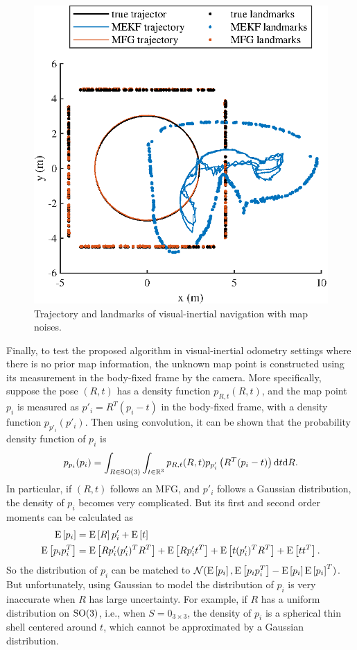 \begin{figure}
	\centering
	\includegraphics[scale=1.1]{figures/VIO-map-filter-trajectory1}
	\caption{Trajectory and landmarks of visual-inertial navigation with map noises.}
	\label{fig:VIO-map-filter-trajectory1}
\end{figure}

Finally, to test the proposed algorithm in visual-inertial odometry settings where there is no prior map information, the unknown map point is constructed using its measurement in the body-fixed frame by the camera.
More specifically, suppose the pose $(R,t)$ has a density function $p_{R,t}(R,t)$, and the map point $p_i$ is measured as $p'_i = R^T(p_i-t)$ in the body-fixed frame, with a density function $p_{p'_i}(p'_i)$.
Then using convolution, it can be shown that the probability density function of $p_i$ is
\begin{align} \label{eqn:VIO-transformPoint}
	p_{p_i}(p_i) = \int_{R\in\mathrm{SO}(3)} \int_{t\in\mathbb{R}^3} p_{R,t}(R,t) p_{p'_i}\left( R^T(p_i-t) \right) \mathrm{d} t \mathrm{d} R.
\end{align}
In particular, if $(R,t)$ follows an MFG, and $p'_i$ follows a Gaussian distribution, the density of $p_i$ becomes very complicated.
But its first and second order moments can be calculated as
\begin{align}
	\mathrm{E}\left[ p_i \right] &= \mathrm{E}\left[ R \right]p'_i + \mathrm{E}\left[ t \right] \\
	\mathrm{E}\left[ p_ip_i^T \right] &= \mathrm{E}\left[ Rp'_i(p'_i)^TR^T \right] + \mathrm{E}\left[ Rp'_it^T \right] + \mathrm{E}\left[ t(p'_i)^TR^T \right] + \mathrm{E}\left[ tt^T \right].
\end{align}
So the distribution of $p_i$ can be matched to $\mathcal{N}(\mathrm{E}\left[ p_i \right], \mathrm{E}\left[ p_ip_i^T \right]-\mathrm{E}\left[ p_i \right]\mathrm{E}\left[ p_i \right]^T)$.
But unfortunately, using Gaussian to model the distribution of $p_i$ is very inaccurate when $R$ has large uncertainty.
For example, if $R$ has a uniform distribution on $\mathrm{SO}(3)$, i.e., when $S = 0_{3\times 3}$, the density of $p_i$ is a spherical thin shell centered around $t$, which cannot be approximated by a Gaussian distribution.

